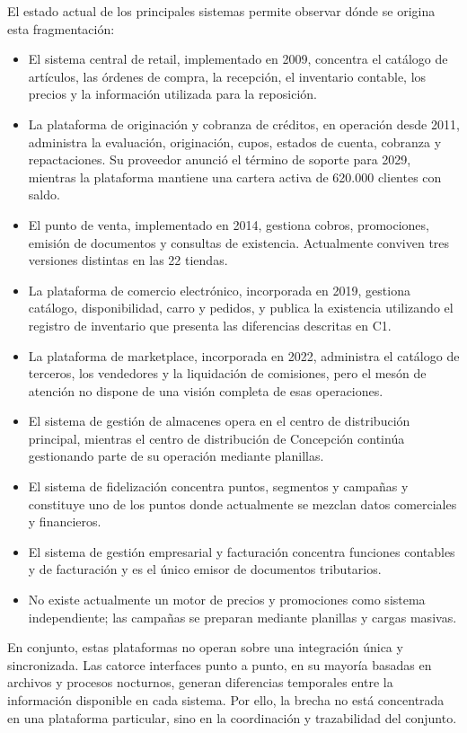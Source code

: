 \documentclass[11pt]{article}
\providecommand{\tightlist}{%
  \setlength{\itemsep}{0pt}\setlength{\parskip}{0pt}}
\begin{document}
El estado actual de los principales sistemas permite observar dónde se origina esta fragmentación:

\begin{itemize}
\tightlist
\item
  El sistema central de retail, implementado en 2009, concentra el catálogo de artículos, las órdenes de compra, la recepción, el inventario contable, los precios y la información utilizada para la reposición.
\item
  La plataforma de originación y cobranza de créditos, en operación desde 2011, administra la evaluación, originación, cupos, estados de cuenta, cobranza y repactaciones. Su proveedor anunció el término de soporte para 2029, mientras la plataforma mantiene una cartera activa de 620.000 clientes con saldo.
\item
  El punto de venta, implementado en 2014, gestiona cobros, promociones, emisión de documentos y consultas de existencia. Actualmente conviven tres versiones distintas en las 22 tiendas.
\item
  La plataforma de comercio electrónico, incorporada en 2019, gestiona catálogo, disponibilidad, carro y pedidos, y publica la existencia utilizando el registro de inventario que presenta las diferencias descritas en C1.
\item
  La plataforma de marketplace, incorporada en 2022, administra el catálogo de terceros, los vendedores y la liquidación de comisiones, pero el mesón de atención no dispone de una visión completa de esas operaciones.
\item
  El sistema de gestión de almacenes opera en el centro de distribución principal, mientras el centro de distribución de Concepción continúa gestionando parte de su operación mediante planillas.
\item
  El sistema de fidelización concentra puntos, segmentos y campañas y constituye uno de los puntos donde actualmente se mezclan datos comerciales y financieros.
\item
  El sistema de gestión empresarial y facturación concentra funciones contables y de facturación y es el único emisor de documentos tributarios.
\item
  No existe actualmente un motor de precios y promociones como sistema independiente; las campañas se preparan mediante planillas y cargas masivas.
\end{itemize}

En conjunto, estas plataformas no operan sobre una integración única y sincronizada. Las catorce interfaces punto a punto, en su mayoría basadas en archivos y procesos nocturnos, generan diferencias temporales entre la información disponible en cada sistema. Por ello, la brecha no está concentrada en una plataforma particular, sino en la coordinación y trazabilidad del conjunto.
\end{document}

